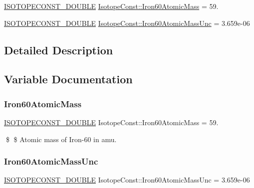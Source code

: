 \begin{DoxyCompactItemize}
\item 
\mbox{\hyperlink{group___isotope_const-_macros_ga8f45a7272ce02c0b4c65c44636ed719a}{I\+S\+O\+T\+O\+P\+E\+C\+O\+N\+S\+T\+\_\+\+D\+O\+U\+B\+LE}} \mbox{\hyperlink{group___isotope_const-_iron-_fe60_ga6744f1f74e93d32ecec69240dcf8f037}{Isotope\+Const\+::\+Iron60\+Atomic\+Mass}} = 59.
\item 
\mbox{\hyperlink{group___isotope_const-_macros_ga8f45a7272ce02c0b4c65c44636ed719a}{I\+S\+O\+T\+O\+P\+E\+C\+O\+N\+S\+T\+\_\+\+D\+O\+U\+B\+LE}} \mbox{\hyperlink{group___isotope_const-_iron-_fe60_gabf7f164fdf8eec1525af7e35b1166eaf}{Isotope\+Const\+::\+Iron60\+Atomic\+Mass\+Unc}} = 3.\+659e-\/06
\end{DoxyCompactItemize}


\subsection{Detailed Description}


\subsection{Variable Documentation}
\mbox{\label{group___isotope_const-_iron-_fe60_ga6744f1f74e93d32ecec69240dcf8f037}} 
\subsubsection{\texorpdfstring{Iron60\+Atomic\+Mass}{Iron60AtomicMass}}
{\footnotesize\ttfamily \mbox{\hyperlink{group___isotope_const-_macros_ga8f45a7272ce02c0b4c65c44636ed719a}{I\+S\+O\+T\+O\+P\+E\+C\+O\+N\+S\+T\+\_\+\+D\+O\+U\+B\+LE}} Isotope\+Const\+::\+Iron60\+Atomic\+Mass = 59.}

\$ \$ Atomic mass of Iron-\/60 in amu. \mbox{\label{group___isotope_const-_iron-_fe60_gabf7f164fdf8eec1525af7e35b1166eaf}} 
\subsubsection{\texorpdfstring{Iron60\+Atomic\+Mass\+Unc}{Iron60AtomicMassUnc}}
{\footnotesize\ttfamily \mbox{\hyperlink{group___isotope_const-_macros_ga8f45a7272ce02c0b4c65c44636ed719a}{I\+S\+O\+T\+O\+P\+E\+C\+O\+N\+S\+T\+\_\+\+D\+O\+U\+B\+LE}} Isotope\+Const\+::\+Iron60\+Atomic\+Mass\+Unc = 3.\+659e-\/06}

